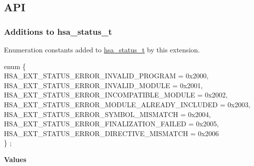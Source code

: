 \documentclass[final,oneside]{book}
\newcommand{\reftyp}[1]{#1}
\newcommand{\refenu}[1]{\reftyp{#1}}
\newenvironment{mylongtable}{\rowcolors{0}{lightgray}{lightgray}\longtable} {
\endlongtable}
\begin{document}
\newpage
\subsection{API}
\makeatletter{}

\subsubsection{Additions to hsa_\-status_\-t}
\vspace{-2.5mm}Enumeration constants added to \hyperlink{group__status_1gad755322e7ff95456520e8abdbe90d225}{hsa_\-status_\-t} by this extension.\begin{mylongtable}{@{}p{\textwidth}}
\rule{0pt}{3ex}enum \{\\\hspace{1.7em}\hypertarget{group__ext-alt-finalizer-extensions_1gga06fc87d81c62e9abb8790b6e5713c55ba058105c75cdda59126637b8c5c0d893e}{\refenu{HSA_\-EXT_\-STATUS_\-ERROR_\-INVALID_\-PROGRAM}} = 0x2000,\\
\hspace{1.7em}\hypertarget{group__ext-alt-finalizer-extensions_1gga06fc87d81c62e9abb8790b6e5713c55ba159ae50ee80394dd6e051f623834ae9c}{\refenu{HSA_\-EXT_\-STATUS_\-ERROR_\-INVALID_\-MODULE}} = 0x2001,\\
\hspace{1.7em}\hypertarget{group__ext-alt-finalizer-extensions_1gga06fc87d81c62e9abb8790b6e5713c55bac84325a8fd9a66c318b099f3e27dba96}{\refenu{HSA_\-EXT_\-STATUS_\-ERROR_\-INCOMPATIBLE_\-MODULE}} = 0x2002,\\
\hspace{1.7em}\hypertarget{group__ext-alt-finalizer-extensions_1gga06fc87d81c62e9abb8790b6e5713c55ba13e40409913e496a80d480eed5308271}{\refenu{HSA_\-EXT_\-STATUS_\-ERROR_\-MODULE_\-ALREADY_\-INCLUDED}} = 0x2003,\\
\hspace{1.7em}\hypertarget{group__ext-alt-finalizer-extensions_1gga06fc87d81c62e9abb8790b6e5713c55bada2ef8c3a1d1cf92d82e6f430a1016af}{\refenu{HSA_\-EXT_\-STATUS_\-ERROR_\-SYMBOL_\-MISMATCH}} = 0x2004,\\
\hspace{1.7em}\hypertarget{group__ext-alt-finalizer-extensions_1gga06fc87d81c62e9abb8790b6e5713c55ba0d1db9dc87ccbdb308cb430b7bbdbcec}{\refenu{HSA_\-EXT_\-STATUS_\-ERROR_\-FINALIZATION_\-FAILED}} = 0x2005,\\
\hspace{1.7em}\hypertarget{group__ext-alt-finalizer-extensions_1gga06fc87d81c62e9abb8790b6e5713c55bae16bcc443d027a0b880fd58f0443227b}{\refenu{HSA_\-EXT_\-STATUS_\-ERROR_\-DIRECTIVE_\-MISMATCH}} = 0x2006\\
\} \hypertarget{group__ext-alt-finalizer-extensions_1ga06fc87d81c62e9abb8790b6e5713c55b}{\textbf{}};\rule[-2ex]{0pt}{0pt}\end{mylongtable}\noindent\textbf{Values}\\[-7mm]
\end{document}
